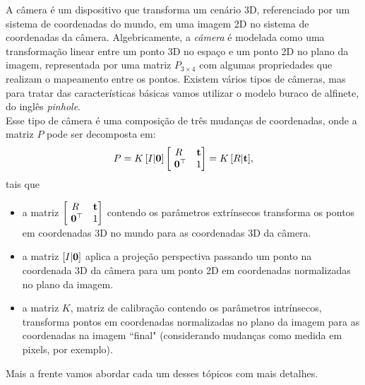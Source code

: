 A câmera é um dispositivo que transforma um cenário 3D, referenciado por um sistema de coordenadas do mundo, em uma imagem 2D no sistema de coordenadas da câmera. Algebricamente, a \textit{câmera} é modelada como uma transformação linear entre um ponto 3D no espaço e um ponto 2D no plano da imagem, representada por uma matriz $P_{3\times4}$ com algumas propriedades que realizam o mapeamento entre os pontos. Existem vários tipos de câmeras, mas para tratar das características básicas vamos utilizar o modelo buraco de alfinete, do inglês \textit{pinhole}.
\\
Esse tipo de câmera é uma composição de três mudanças de coordenadas, onde a matriz $P$ pode ser decomposta em:
\begin{equation*}
P = K \, [I|{\bf 0}]
\begin{bmatrix}
R&{\bf t}\\
\,\,{\bf 0}^\top &1
\end{bmatrix}
= K\,[R|{\bf t}],
\end{equation*}
tais que 
\begin{itemize}
\item a matriz $\begin{bmatrix}
R&{\bf t}\\
\,\,{\bf 0}^\top &1
\end{bmatrix}$
contendo os parâmetros extrínsecos transforma os pontos em coordenadas 3D no mundo para as coordenadas 3D da câmera.
\item a matriz $[I|{\bf 0}]$ aplica a projeção perspectiva passando um ponto na coordenada 3D da câmera para um ponto 2D em coordenadas normalizadas no plano da imagem.
\item a matriz $K$, matriz de calibração contendo os parâmetros intrínsecos, transforma pontos em coordenadas normalizadas no plano da imagem para as coordenadas na imagem ``final" (considerando mudanças como medida em pixels, por exemplo).  
\end{itemize}
Mais a frente vamos abordar cada um desses tópicos com mais detalhes.

